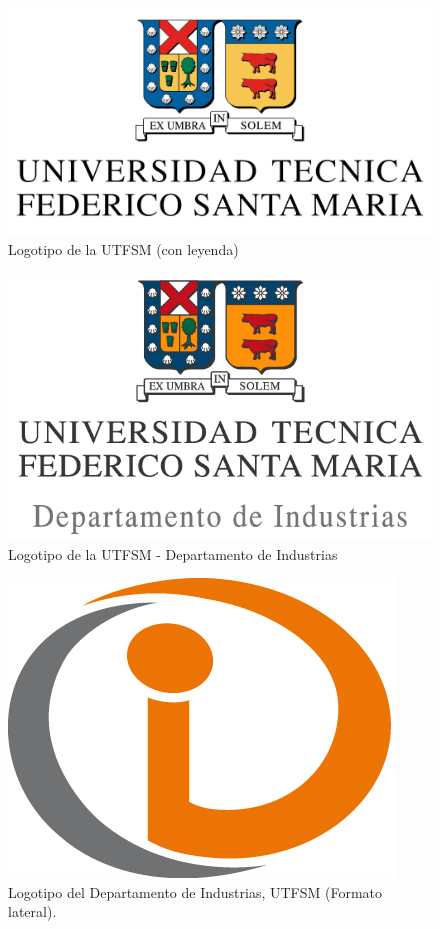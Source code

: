 \begin{figure}[ht!]
\centering
\includegraphics[scale = .45]{figures/logousmleyenda.png}
\caption{Logotipo de la UTFSM (con leyenda)}
\label{fig:logousmleyenda}
\end{figure}


\begin{figure}[ht!]
\centering
\includegraphics[scale = .75]{figures/logousmind.jpg}
\caption{Logotipo de la UTFSM - Departamento de Industrias}
\label{fig:logousmind}
\end{figure}

\begin{figure}[ht!]
    \centering
    \includegraphics[width=.8\textwidth]{figures/logo_utfsm_di.png}
    \caption{Logotipo del Departamento de Industrias, UTFSM (Formato lateral).}
    \label{fig:logodiutfsm}
\end{figure}

